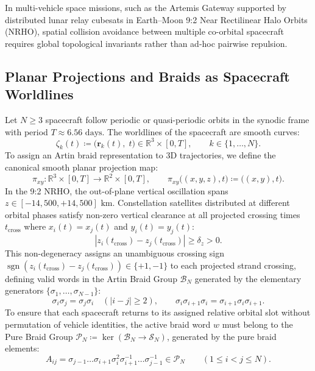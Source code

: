 \documentclass[11pt,a4paper,reqno]{article}
\theoremstyle{plain}
\theoremstyle{definition}
\theoremstyle{remark}
\numberwithin{equation}{section}
\begin{document}
In multi-vehicle space missions, such as the Artemis Gateway supported by distributed lunar relay cubesats in Earth--Moon 9:2 Near Rectilinear Halo Orbits (NRHO), spatial collision avoidance between multiple co-orbital spacecraft requires global topological invariants rather than ad-hoc pairwise repulsion.

\subsection{Planar Projections and Braids as Spacecraft Worldlines}
\label{subsec:braids_worldlines}

Let $N \ge 3$ spacecraft follow periodic or quasi-periodic orbits in the synodic frame with period $T \approx 6.56\text{ days}$. The worldlines of the spacecraft are smooth curves:
\begin{equation}
  \zeta_k(t) \coloneqq \big( \bm{r}_k(t), \; t \big) \in \mathbb{R}^3 \times [0, T], \qquad k \in \{1, \dots, N\}.
\end{equation}
To assign an Artin braid representation to 3D trajectories, we define the canonical smooth planar projection map:
\begin{equation}
  \pi_{xy}: \mathbb{R}^3 \times [0, T] \to \mathbb{R}^2 \times [0, T], \qquad \pi_{xy}\big( (x, y, z), t \big) \coloneqq \big( (x, y), t \big).
\end{equation}
In the 9:2 NRHO, the out-of-plane vertical oscillation spans $z \in [-14{,}500, +14{,}500]\text{ km}$. Constellation satellites distributed at different orbital phases satisfy non-zero vertical clearance at all projected crossing times $t_{\mathrm{cross}}$ where $x_i(t) = x_j(t)$ and $y_i(t) = y_j(t)$:
\begin{equation}
  |z_i(t_{\mathrm{cross}}) - z_j(t_{\mathrm{cross}})| \ge \delta_z > 0.
\end{equation}
This non-degeneracy assigns an unambiguous crossing sign $\operatorname{sgn}(z_i(t_{\mathrm{cross}}) - z_j(t_{\mathrm{cross}})) \in \{+1, -1\}$ to each projected strand crossing, defining valid words in the Artin Braid Group $\mathcal{B}_N$ generated by the elementary generators $\{\sigma_1, \dots, \sigma_{N-1}\}$:
\begin{equation}
  \sigma_i \sigma_j = \sigma_j \sigma_i \quad (|i - j| \ge 2), \qquad \sigma_i \sigma_{i+1} \sigma_i = \sigma_{i+1} \sigma_i \sigma_{i+1}.
  \label{eq:artin_relations}
\end{equation}
To ensure that each spacecraft returns to its assigned relative orbital slot without permutation of vehicle identities, the active braid word $w$ must belong to the Pure Braid Group $\mathcal{P}_N \coloneqq \ker(\mathcal{B}_N \to \mathcal{S}_N)$, generated by the pure braid elements:
\begin{equation}
  A_{ij} = \sigma_{j-1} \dots \sigma_{i+1} \sigma_i^2 \sigma_{i+1}^{-1} \dots \sigma_{j-1}^{-1} \in \mathcal{P}_N \qquad (1 \le i < j \le N).
\end{equation}
\end{document}
